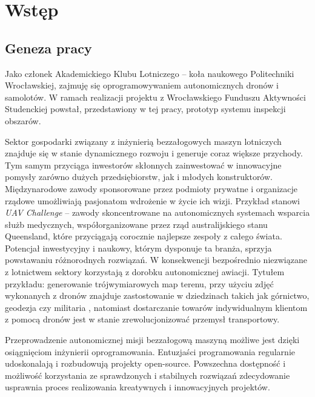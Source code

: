 \chapter{Wstęp}


\section{Geneza pracy} \label{intro_genesis}

Jako członek Akademickiego Klubu Lotniczego -- koła naukowego Politechniki Wrocławskiej,
zajmuję się oprogramowywaniem autonomicznych dronów i samolotów. W ramach realizacji
projektu z Wrocławskiego Funduszu Aktywności Studenckiej powstał, przedstawiony w
tej pracy, prototyp systemu inspekcji obszarów.

Sektor gospodarki związany z inżynierią bezzałogowych maszyn lotniczych znajduje się
w stanie dynamicznego rozwoju i generuje coraz większe przychody.
Tym samym przyciąga inwestorów skłonnych zainwestować w innowacyjne pomysły zarówno 
dużych przedsiębiorstw, jak i młodych konstruktorów. Międzynarodowe zawody sponsorowane
przez podmioty prywatne i organizacje rządowe umożliwiają pasjonatom wdrożenie w życie
ich wizji. Przykład stanowi \textit{UAV Challenge} -- zawody skoncentrowane na
autonomicznych systemach wsparcia służb medycznych, współorganizowane przez rząd
australijskiego stanu Queensland, które przyciągają corocznie najlepsze zespoły z całego
świata\cite{uav_sponsors}. Potencjał inwestycyjny i naukowy, którym dysponuje ta branża,
sprzyja powstawaniu różnorodnych rozwiązań. W konsekwencji bezpośrednio niezwiązane z
lotnictwem sektory korzystają z dorobku autonomicznej awiacji. Tytułem przykładu: 
generowanie trójwymiarowych map terenu, przy użyciu zdjęć wykonanych z dronów znajduje
zastostowanie w dziedzinach takich jak górnictwo, geodezja czy militaria
\cite{uav_photogrametry}, natomiast dostarczanie towarów indywidualnym klientom z pomocą
dronów jest w stanie zrewolucjonizować przemysł transportowy.

Przeprowadzenie autonomicznej misji bezzałogową maszyną możliwe jest dzięki osiągnięciom
inżynierii oprogramowania. Entuzjaści programowania regularnie udoskonalają i rozbudowują
projekty open-source. Powszechna dostępność i możliwość korzystania ze sprawdzonych
i stabilnych rozwiązań zdecydowanie usprawnia proces realizowania
kreatywnych i innowacyjnych projektów. 


